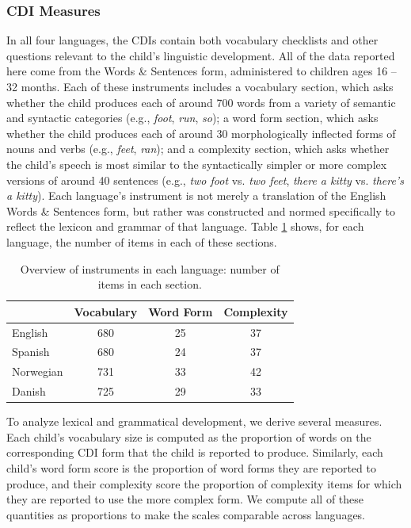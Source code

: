 \documentclass[10pt,letterpaper]{article}
\begin{document}
\subsubsection{CDI Measures}

In all four languages, the CDIs contain both vocabulary checklists and other questions relevant to the child's linguistic development. All of the data reported here come from the Words \& Sentences form, administered to children ages 16 -- 32 months. Each of these instruments includes a vocabulary section, which asks whether the child produces each of around 700 words from a variety of semantic and syntactic categories (e.g., \emph{foot}, \emph{run}, \emph{so}); a word form section, which asks whether the child produces each of around 30 morphologically inflected forms of nouns and verbs (e.g., \emph{feet}, \emph{ran}); and a complexity section, which asks whether the child's speech is most similar to the syntactically simpler or more complex versions of around 40 sentences (e.g., \emph{two foot} vs. \emph{two feet}, \emph{there a kitty} vs. \emph{there's a kitty}). Each language's instrument is not merely a translation of the English Words \& Sentences form, but rather was constructed and normed specifically to reflect the lexicon and grammar of that language. Table \ref{table:measures} shows, for each language, the number of items in each of these sections.

\begin{table}
\begin{center}
\begin{tabular}{lccc}
\hline
& Vocabulary & Word Form & Complexity\\ 
\hline
English & 680 & 25 & 37\\ 
Spanish & 680 & 24 & 37\\ 
Norwegian & 731 & 33 & 42\\ 
Danish & 725 & 29 & 33\\ 
\hline
\end{tabular}
\end{center}
\caption{\label{table:measures} Overview of instruments in each language: number of items in each section.}
\end{table}

To analyze lexical and grammatical development, we derive several measures. Each child's vocabulary size is computed as the proportion of words on the corresponding CDI form that the child is reported to produce. Similarly, each child's word form score is the proportion of word forms they are reported to produce, and their complexity score the proportion of complexity items for which they are reported to use the more complex form. We compute all of these quantities as proportions to make the scales comparable across languages.
\end{document}
